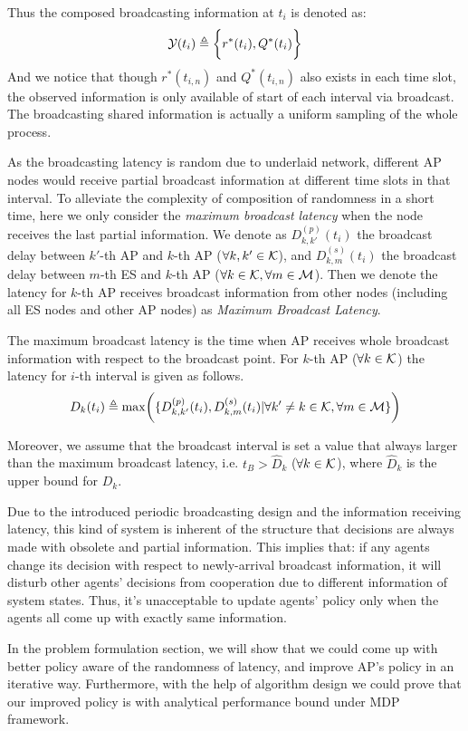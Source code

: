 Thus the composed broadcasting information at $t_i$ is denoted as:
\begin{align}
    \mathcal{Y}(t_i) \triangleq
        \bigg\{
            r^*(t_i),
            Q^*(t_i)
        \bigg\}
\end{align}
And we notice that though $r^*(t_{i,n})$ and $Q^*(t_{i,n})$ also exists in each time slot, the observed information is only available of start of each interval via broadcast. The broadcasting shared information is actually a uniform sampling of the whole process.

As the broadcasting latency is random due to underlaid network, different AP nodes would receive partial broadcast information at different time slots in that interval. To alleviate the complexity of composition of randomness in a short time, here we only consider the \emph{maximum broadcast latency} when the node receives the last partial information.
We denote as $D^{(p)}_{k,k'}(t_i)$ the broadcast delay between $k'$-th AP and $k$-th AP ($\forall k,k'\in\mathcal{K}$), and $D^{(s)}_{k,m}(t_i)$ the broadcast delay between $m$-th ES and $k$-th AP ($\forall k\in\mathcal{K},\forall m\in\mathcal{M}$).
Then we denote the latency for $k$-th AP receives broadcast information from other nodes (including all ES nodes and other AP nodes) as \emph{Maximum Broadcast Latency}.
\begin{definition}
    The maximum broadcast latency is the time when AP receives whole broadcast information with respect to the broadcast point. For $k$-th AP ($\forall k\in\mathcal{K}$) the latency for $i$-th interval is given as follows.
    \begin{align}
        D_{k}(t_i) \define \max\Paren{ \set{D^{(p)}_{k,k'}(t_i), D^{(s)}_{k,m}(t_i)|\forall k' \neq k \in\apSet, \forall m\in\esSet} }
    \end{align}
\end{definition}
Moreover, we assume that the broadcast interval is set a value that always larger than the maximum broadcast latency, i.e. $t_B > \hat{D}_k$ ($\forall k\in\mathcal{K}$), where $\hat{D}_k$ is the upper bound for $D_k$.

{\color{red}
    Due to the introduced periodic broadcasting design and the information receiving latency, this kind of system is inherent of the structure that decisions are always made with obsolete and partial information.
    This implies that: if any agents change its decision with respect to newly-arrival broadcast information, it will disturb other agents' decisions from cooperation due to different information of system states.
    Thus, it's unacceptable to update agents' policy only when the agents all come up with exactly same information.
}
        
In the problem formulation section, we will show that we could come up with better policy aware of the randomness of latency, and improve AP's policy in an iterative way.
Furthermore, with the help of algorithm design we could prove that our improved policy is with analytical performance bound under MDP framework.

